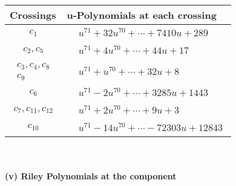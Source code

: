 \documentclass[1p]{elsarticle_modified}
\theoremstyle{definition}
\begin{document}
\begin{tabular}{m{50pt}|m{274pt}}
Crossings & \hspace{64pt}u-Polynomials at each crossing \\
\hline $$\begin{aligned}c_{1}\end{aligned}$$&$\begin{aligned}
&u^{71}+32 u^{70}+\cdots+7410 u+289
\end{aligned}$\\
\hline $$\begin{aligned}c_{2},c_{5}\end{aligned}$$&$\begin{aligned}
&u^{71}+4 u^{70}+\cdots+44 u+17
\end{aligned}$\\
\hline $$\begin{aligned}c_{3},c_{4},c_{8}\\c_{9}\end{aligned}$$&$\begin{aligned}
&u^{71}+u^{70}+\cdots+32 u+8
\end{aligned}$\\
\hline $$\begin{aligned}c_{6}\end{aligned}$$&$\begin{aligned}
&u^{71}-2 u^{70}+\cdots+3285 u+1443
\end{aligned}$\\
\hline $$\begin{aligned}c_{7},c_{11},c_{12}\end{aligned}$$&$\begin{aligned}
&u^{71}+2 u^{70}+\cdots+9 u+3
\end{aligned}$\\
\hline $$\begin{aligned}c_{10}\end{aligned}$$&$\begin{aligned}
&u^{71}-14 u^{70}+\cdots-72303 u+12843
\end{aligned}$\\
\hline
\end{tabular}\\~\\
\newpage\renewcommand{\arraystretch}{1}
\flushleft \textbf{(v) Riley Polynomials at the component}\newline \\
\end{document}
